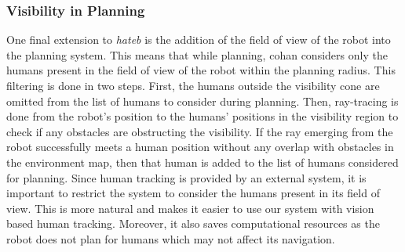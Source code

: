 \subsubsection{Visibility in Planning}
One final extension to \textit{\acrshort{hateb}} is the addition of the field of view of the robot into the planning system. This means that while planning, \acrshort{cohan} considers only the humans present in the field of view of the robot within the planning radius. This filtering is done in two steps. First, the humans outside the visibility cone are omitted from the list of humans to consider during planning. Then, ray-tracing is done from the robot's position to the humans' positions in the visibility region to check if any obstacles are obstructing the visibility. If the ray emerging from the robot successfully meets a human position without any overlap with obstacles in the environment map, then that human is added to the list of humans considered for planning. Since human tracking is provided by an external system, it is important to restrict the system to consider the humans present in its field of view. This is more natural and makes it easier to use our system with vision based human tracking. Moreover, it also saves computational resources as the robot does not plan for humans which may not affect its navigation. 


